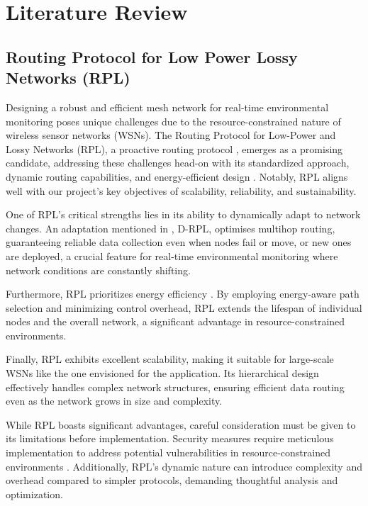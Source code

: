
\section*{Literature Review}\label{sec:lr}

\subsection*{Routing Protocol for Low Power Lossy Networks (RPL)}\label{sec:lr_rpl}

Designing a robust and efficient mesh network for real-time environmental monitoring poses unique challenges due to the resource-constrained nature of wireless sensor networks (WSNs). The Routing Protocol for Low-Power and Lossy Networks (RPL), a proactive routing protocol \cite{rechache_study_2021}, emerges as a promising candidate, addressing these challenges head-on with its standardized approach, dynamic routing capabilities, and energy-efficient design \cite{alexander_rpl_2012, Kharrufa2019RPL-Based}. Notably, RPL aligns well with our project's key objectives of scalability, reliability, and sustainability.

One of RPL's critical strengths lies in its ability to dynamically adapt to network changes. An adaptation mentioned in \cite{kharrufa_dynamic_2017}, D-RPL, optimises multihop routing, guaranteeing reliable data collection even when nodes fail or move, or new ones are deployed, a crucial feature for real-time environmental monitoring where network conditions are constantly shifting.

Furthermore, RPL prioritizes energy efficiency \cite{info8040124}. By employing energy-aware path selection and minimizing control overhead, RPL extends the lifespan of individual nodes and the overall network, a significant advantage in resource-constrained environments.

Finally, RPL exhibits excellent scalability, making it suitable for large-scale WSNs like the one envisioned for the application. Its hierarchical design effectively handles complex network structures, ensuring efficient data routing even as the network grows in size and complexity.

While RPL boasts significant advantages, careful consideration must be given to its limitations before implementation. Security measures require meticulous implementation to address potential vulnerabilities in resource-constrained environments \cite{arena_evaluating_2020, mayzaud_distributed_2017, 8998289}. Additionally, RPL's dynamic nature can introduce complexity and overhead compared to simpler protocols, demanding thoughtful analysis and optimization.

